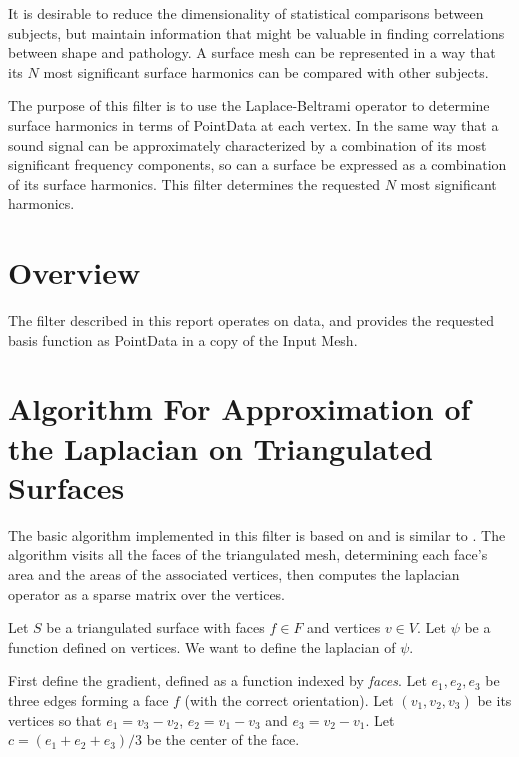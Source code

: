 \documentclass{InsightArticle}
\begin{document}
It is desirable to reduce the dimensionality of statistical comparisons
between subjects, but maintain information that might be valuable in finding
correlations between shape and pathology.  A surface mesh can be represented in
a way that its $N$ most significant surface harmonics can be compared with other
subjects.

The purpose of this filter is to use the Laplace-Beltrami operator to determine
surface harmonics in terms of PointData at each vertex.  In the same way that
a sound signal can be approximately characterized by a combination of its most
significant frequency components, so can a surface be expressed as a combination
of its surface harmonics.  This filter determines the requested $N$ most
significant harmonics.


\section{Overview}

The filter described in this report operates on 
data, and provides
the requested basis function as PointData in a copy of the Input Mesh.



\section{Algorithm For Approximation of the Laplacian on Triangulated Surfaces}

The basic algorithm implemented in this filter is based on \cite{Qiu06} and
is similar to \cite{Levy09}.  The algorithm visits all the
faces of the triangulated mesh, determining each face's area and the areas of
the associated vertices, then computes the laplacian operator as a sparse
matrix over the vertices.





Let $S$ be a triangulated surface with faces $f\in F$ and vertices
$v\in V$. Let $\psi$ be a function defined on vertices. We want to
define the laplacian of $\psi$.

First define the gradient, defined as a function indexed by {\em faces}. Let
$e_1, e_2, e_3$ be three edges forming a face $f$ (with the correct
orientation). Let $(v_1, v_2, v_3)$ be its vertices so that $e_1 =
v_3- v_2$, $e_2=v_1 - v_3$ and $e_3 = v_2 - v_1$. Let $c =
(e_1+e_2+e_3)/3$ be the center of the face.
\end{document}
